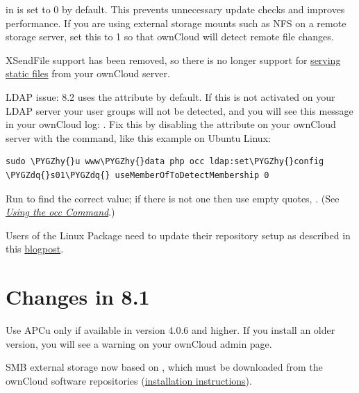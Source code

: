 \documentclass[letterpaper,10pt,english]{sphinxmanual}
\def\PYGZhy{\char`\-}
\def\PYGZdq{\char`\"}
\begin{document}
 in  is set to 0 by default. This
prevents unnecessary update checks and improves performance. If you are using
external storage mounts such as NFS on a remote storage server, set this to 1
so that ownCloud will detect remote file changes.

XSendFile support has been removed, so there is no longer support for \href{https://doc.owncloud.org/server/8.1/admin\_manual/configuration\_files/serving\_static\_files\_configuration.html}{serving
static files} from your ownCloud server.

LDAP issue: 8.2 uses the  attribute by default. If this is not
activated on your LDAP server your user groups will not be detected, and you
will see this message in your ownCloud log: .
Fix this by disabling the  attribute on your ownCloud server with
the  command, like this example on Ubuntu Linux:

\begin{Verbatim}[commandchars=\\\{\}]
sudo \PYGZhy{}u www\PYGZhy{}data php occ ldap:set\PYGZhy{}config \PYGZdq{}s01\PYGZdq{} useMemberOfToDetectMembership 0
\end{Verbatim}

Run  to find the correct 
value; if there is not one then use empty quotes, . (See
{\hyperref[configuration_server/occ_command::doc]{\emph{\emph{Using the occ Command}}}}.)

Users of the Linux Package need to update their repository setup as described
in this \href{https://owncloud.org/blog/upgrading-to-owncloud-server-8-2/}{blogpost}.


\section{Changes in 8.1}
\label{release_notes:changes-in-8-1}
Use APCu only if available in version 4.0.6 and higher. If you install an older version,
you will see a  warning on your ownCloud admin page.

SMB external storage now based on , which must be downloaded
from the ownCloud software repositories (\href{https://software.opensuse.org/download.html?project=isv\%3AownCloud\%3Acommunity\%3A8.1\&package=php5-libsmbclient}{installation instructions}).
\end{document}
